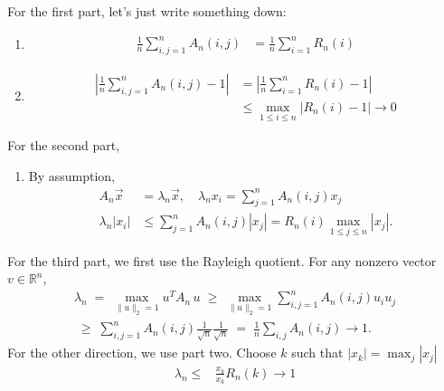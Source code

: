 \documentclass[../main]{subfiles}
\begin{document}
\begin{solution}
    For the first part, let's just write something down:
    \begin{enumerate}
        \item 
        \begin{align*}
        \frac{1}{n} \sum_{i,j=1}^n A_n(i,j) &= \frac{1}{n} \sum_{i=1}^n R_n(i)
    \end{align*}
        \item \begin{align*}
        \left|\frac{1}{n} \sum_{i,j=1}^n A_n(i,j) - 1\right| &= \left|\frac{1}{n} \sum_{i=1}^n R_n(i) - 1\right|\\
        &\leq \max_{1\leq i\leq n} |R_n(i) - 1| \to 0
    \end{align*}
    \end{enumerate}
    
    For the second part, 
    \begin{enumerate}
        \item By assumption, \begin{align*}
        A_n \vec x &= \lambda_n \vec x, \quad \lambda_n x_i = \sum_{j=1}^n A_n(i,j)x_j\\
        \lambda_n |x_i|&\leq \sum_{j=1}^n A_n(i,j)|x_j| = R_n(i) \max_{1\leq j \leq n} |x_j|.
    \end{align*}
    \end{enumerate}
    
    For the third part, we first use the Rayleigh quotient. For any nonzero vector $v\in\mathbb R^n$,
    \begin{align*}
      \lambda_n \;=\;\max_{\|u\|_2=1}u^T A_n\,u
      \;\ge\;
      \max_{\|u\|_2=1} \sum_{i,j=1}^n A_n(i,j)u_i u_j\\
      \;\geq\;\sum_{i,j=1}^n A_n(i,j)\frac{1}{\sqrt{n}}\frac{1}{\sqrt{n}}
      \;=\;
      \frac1n\sum_{i,j}A_n(i,j) \to 1.
    \end{align*}
    For the other direction, we use part two. Choose $k$ such that $|x_k| = \max_{j} |x_j|$
    \begin{align*}
        \lambda_n \leq &\frac{x_k}{x_k} R_n(k) \to 1
    \end{align*}
\end{solution}
\end{document}
